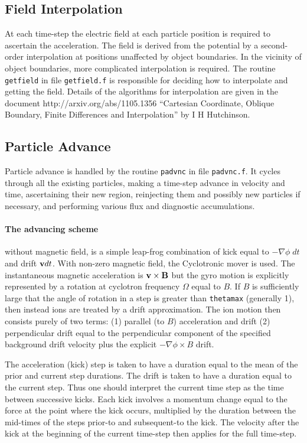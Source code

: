 \documentclass[12pt]{article}
\begin{document}
\subsection{Field Interpolation}

At each time-step the electric field at each particle position is
required to ascertain the acceleration. The field is derived from the
potential by a second-order interpolation at positions unaffected by
object boundaries. In the vicinity of object boundaries, more
complicated interpolation is required. The routine \verb!getfield! in
file \verb!getfield.f! is responsible for deciding how to interpolate
and getting the field. Details of the algorithms for interpolation are
given in the document http://arxiv.org/abs/1105.1356 ``Cartesian
Coordinate, Oblique Boundary, Finite Differences and Interpolation''
by I H Hutchinson.

\subsection{Particle Advance}

Particle advance is handled by the routine \verb!padvnc! in file
\verb!padvnc.f!. It cycles through all the existing particles, making
a time-step advance in velocity and time, ascertaining their new
region, reinjecting them and possibly new particles if necessary, and
performing various flux and diagnostic accumulations.

\paragraph{The advancing scheme} without magnetic field, is a simple
leap-frog combination of kick equal to $-\nabla\phi\;dt$ and drift
${\bf v} dt$. With non-zero magnetic field, the Cyclotronic mover is
used. The instantaneous magnetic acceleration is
${\bf v}\times{\bf B}$ but the gyro motion is explicitly represented
by a rotation at cyclotron frequency $\Omega$ equal to $B$. If $B$ is
sufficiently large that the angle of rotation in a step is greater
than \verb!thetamax! (generally 1), then instead ions are treated by a
drift approximation. The ion motion then consists purely of two terms:
(1) parallel (to $B$) acceleration and drift (2) perpendicular drift
equal to the perpendicular component of the specified background drift
velocity plus the explicit $-\nabla\phi\times B$ drift.

The
acceleration (kick) step is taken to have a duration equal to the mean
of the prior and current step durations. The drift is taken to have a
duration equal to the current step. Thus one should interpret the
current time step as the time between successive kicks. Each kick
involves a momentum change equal to the force at the point where the
kick occurs, multiplied by the duration between the mid-times of the
steps prior-to and subsequent-to the kick. The velocity after the kick
at the beginning of the current time-step then applies for the full
time-step. 
\end{document}
